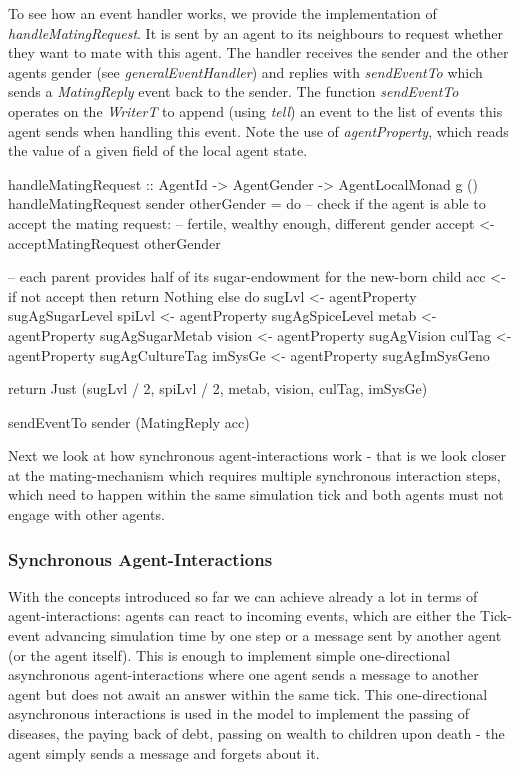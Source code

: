 To see how an event handler works, we provide the implementation of \textit{handleMatingRequest}. It is sent by an agent to its neighbours to request whether they want to mate with this agent. The handler receives the sender and the other agents gender (see \textit{generalEventHandler}) and replies with \textit{sendEventTo} which sends a \textit{MatingReply} event back to the sender. The function \textit{sendEventTo} operates on the \textit{WriterT} to append (using \textit{tell}) an event to the list of events this agent sends when handling this event. Note the use of \textit{agentProperty}, which reads the value of a given field of the local agent state. 

\begin{HaskellCode}
handleMatingRequest :: AgentId
                    -> AgentGender
                    -> AgentLocalMonad g ()
handleMatingRequest sender otherGender = do
  -- check if the agent is able to accept the mating request: 
  -- fertile, wealthy enough, different gender
  accept <- acceptMatingRequest otherGender

  -- each parent provides half of its sugar-endowment for the new-born child
  acc <- if not accept
      then return Nothing
      else do
        sugLvl  <- agentProperty sugAgSugarLevel
        spiLvl  <- agentProperty sugAgSpiceLevel
        metab   <- agentProperty sugAgSugarMetab
        vision  <- agentProperty sugAgVision
        culTag  <- agentProperty sugAgCultureTag
        imSysGe <- agentProperty sugAgImSysGeno

        return Just (sugLvl / 2, spiLvl / 2, metab, vision, culTag, imSysGe)

  sendEventTo sender (MatingReply acc)
\end{HaskellCode}

Next we look at how synchronous agent-interactions work - that is we look closer at the mating-mechanism which requires multiple synchronous interaction steps, which need to happen within the same simulation tick and both agents must not engage with other agents.

\subsubsection{Synchronous Agent-Interactions}
With the concepts introduced so far we can achieve already a lot in terms of agent-interactions: agents can react to incoming events, which are either the Tick-event advancing simulation time by one step or a message sent by another agent (or the agent itself). This is enough to implement simple one-directional asynchronous agent-interactions where one agent sends a message to another agent but does not await an answer within the same tick. This one-directional asynchronous interactions is used in the model to implement the passing of diseases, the paying back of debt, passing on wealth to children upon death - the agent simply sends a message and forgets about it.

